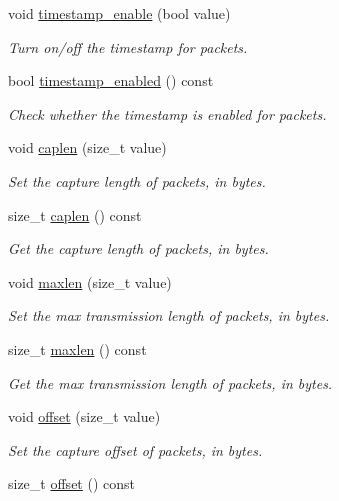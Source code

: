 \begin{DoxyCompactItemize}
void \hyperlink{classnet_1_1pfq_ac8dc23932b27dd04c8ecbdcbabe931b8}{timestamp\-\_\-enable} (bool value)
\begin{DoxyCompactList}\small\item\em Turn on/off the timestamp for packets. \end{DoxyCompactList}\item 
bool \hyperlink{classnet_1_1pfq_a7939df6cf5127dd8672e1ca0a68fa648}{timestamp\-\_\-enabled} () const 
\begin{DoxyCompactList}\small\item\em Check whether the timestamp is enabled for packets. \end{DoxyCompactList}\item 
void \hyperlink{classnet_1_1pfq_aa915603b2ad8d1226f9bbea0050945c0}{caplen} (size\-\_\-t value)
\begin{DoxyCompactList}\small\item\em Set the capture length of packets, in bytes. \end{DoxyCompactList}\item 
size\-\_\-t \hyperlink{classnet_1_1pfq_aa0d64b89a345ca5426a694f6583106c3}{caplen} () const 
\begin{DoxyCompactList}\small\item\em Get the capture length of packets, in bytes. \end{DoxyCompactList}\item 
void \hyperlink{classnet_1_1pfq_a0424e39990711493af4f24a0c3e9be4d}{maxlen} (size\-\_\-t value)
\begin{DoxyCompactList}\small\item\em Set the max transmission length of packets, in bytes. \end{DoxyCompactList}\item 
size\-\_\-t \hyperlink{classnet_1_1pfq_a869695c441902d0342212d7581f3e362}{maxlen} () const 
\begin{DoxyCompactList}\small\item\em Get the max transmission length of packets, in bytes. \end{DoxyCompactList}\item 
void \hyperlink{classnet_1_1pfq_a83ed78c8c7bc2de33e75e244bbc0b603}{offset} (size\-\_\-t value)
\begin{DoxyCompactList}\small\item\em Set the capture offset of packets, in bytes. \end{DoxyCompactList}\item 
size\-\_\-t \hyperlink{classnet_1_1pfq_ad419e5ef48bb5f9639c798b3d2dd1660}{offset} () const 

\end{DoxyCompactItemize}
